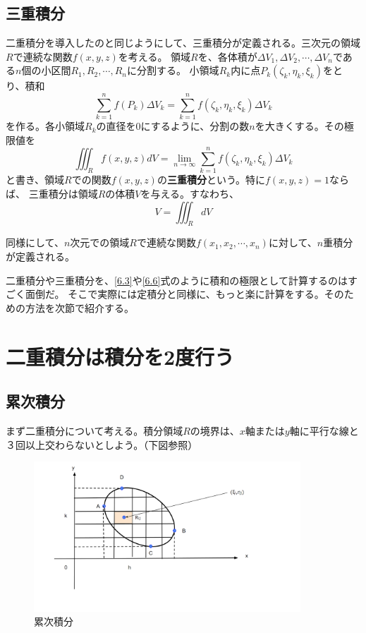 \documentclass[a4j,dvipdfmx]{jsarticle}
\begin{document}
\subsection{三重積分}
二重積分を導入したのと同じようにして、三重積分が定義される。三次元の領域$R$で連続な関数$f(x,y,z)$を考える。
領域$R$を、各体積が$\Delta V_1,\Delta V_2,\cdots,\Delta V_n$である$n$個の小区間$R_1,R_2,\cdots,R_n$に分割する。
小領域$R_k$内に点$P_k(\zeta_k,\eta_k,\xi_k)$をとり、積和
\begin{equation}
    \sum_{k=1}^{n}f(P_k)\Delta V_k=\sum_{k=1}^{n}f(\zeta_k,\eta_k,\xi_k)\Delta V_k\label{6.5}
\end{equation}
を作る。各小領域$R_k$の直径を0にするように、分割の数$n$を大きくする。その極限値を
\begin{equation}
    \iiint_R f(x,y,z)dV=\lim_{n\to\infty}\sum_{k=1}^{n}f(\zeta_k,\eta_k,\xi_k)\Delta V_k\label{6.6}
\end{equation}
と書き、領域$R$での関数$f(x,y,z)$の\textbf{三重積分}という。特に$f(x,y,z)=1$ならば、
三重積分は領域$R$の体積$V$を与える。すなわち、
\begin{equation}
    V=\iiint_R dV\label{6.7}
\end{equation}

同様にして、$n$次元での領域$R$で連続な関数$f(x_1,x_2,\cdots,x_n)$に対して、$n$重積分が定義される。

二重積分や三重積分を、\eqref{6.3}や\eqref{6.6}式のように積和の極限として計算するのはすごく面倒だ。
そこで実際には定積分と同様に、もっと楽に計算をする。そのための方法を次節で紹介する。

\section{二重積分は積分を2度行う}
\subsection{累次積分}
まず二重積分について考える。積分領域$R$の境界は、$x$軸または$y$軸に平行な線と３回以上交わらないとしよう。（下図参照）
\begin{figure}[h]
    \centering
    \includegraphics[width=10cm,scale=5]{img/累次積分.png}
    \caption{累次積分}
\end{figure}
\end{document}

